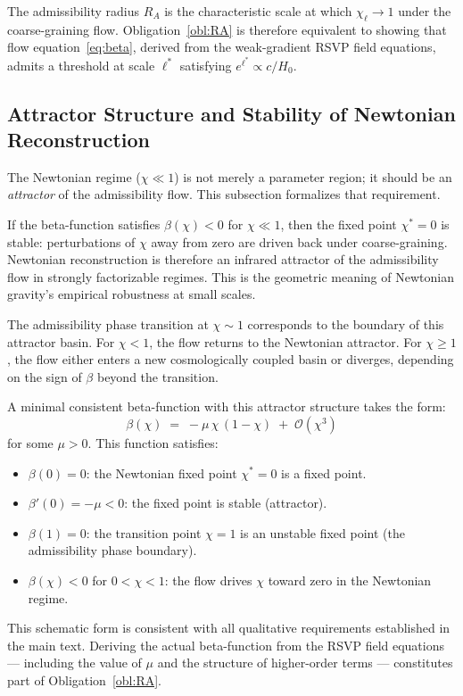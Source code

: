 \documentclass[11pt, a4paper]{article}
\theoremstyle{plain}
\theoremstyle{definition}
\theoremstyle{remark}
\newcommand{\RA}{R_{\!A}}
\begin{document}
The admissibility radius $\RA$ is the characteristic scale at which $\chi_\ell \to
1$ under the coarse-graining flow. Obligation~\ref{obl:RA} is therefore equivalent
to showing that flow equation~\eqref{eq:beta}, derived from the weak-gradient RSVP
field equations, admits a threshold at scale $\ell^*$ satisfying $e^{\ell^*} \propto
c/H_0$.

\subsection{Attractor Structure and Stability of Newtonian Reconstruction}
\label{app:attractor}

The Newtonian regime ($\chi \ll 1$) is not merely a parameter region; it should be
an \emph{attractor} of the admissibility flow. This subsection formalizes that
requirement.

If the beta-function satisfies $\beta(\chi) < 0$ for $\chi \ll 1$, then the fixed
point $\chi^* = 0$ is stable: perturbations of $\chi$ away from zero are driven back
under coarse-graining. Newtonian reconstruction is therefore an infrared attractor of
the admissibility flow in strongly factorizable regimes. This is the geometric
meaning of Newtonian gravity's empirical robustness at small scales.

The admissibility phase transition at $\chi \sim 1$ corresponds to the boundary of
this attractor basin. For $\chi < 1$, the flow returns to the Newtonian attractor.
For $\chi \geq 1$, the flow either enters a new cosmologically coupled basin or
diverges, depending on the sign of $\beta$ beyond the transition.

A minimal consistent beta-function with this attractor structure takes the form:
\[
  \beta(\chi) \;=\; -\mu\,\chi\,(1 - \chi) \;+\; \mathcal{O}(\chi^3)
\]
for some $\mu > 0$. This function satisfies:
\begin{itemize}
  \item $\beta(0) = 0$: the Newtonian fixed point $\chi^* = 0$ is a fixed point.
  \item $\beta'(0) = -\mu < 0$: the fixed point is stable (attractor).
  \item $\beta(1) = 0$: the transition point $\chi = 1$ is an unstable fixed point
    (the admissibility phase boundary).
  \item $\beta(\chi) < 0$ for $0 < \chi < 1$: the flow drives $\chi$ toward zero
    in the Newtonian regime.
\end{itemize}
This schematic form is consistent with all qualitative requirements established in
the main text. Deriving the actual beta-function from the RSVP field equations ---
including the value of $\mu$ and the structure of higher-order terms --- constitutes
part of Obligation~\ref{obl:RA}.
\end{document}

